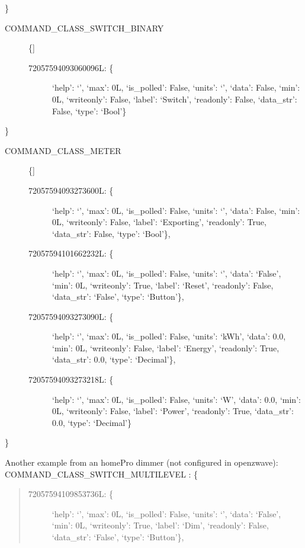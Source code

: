 \documentclass[letterpaper,10pt,english]{sphinxmanual}
\begin{document}
\begin{fulllineitems}
\begin{description}
\begin{description}
\end{description}

\end{description}

\}
\begin{description}
\item[{COMMAND\_CLASS\_SWITCH\_BINARY}] \leavevmode{[}\{{]}\begin{description}
\item[{72057594093060096L: \{}] \leavevmode
`help': `',
`max': 0L,
`is\_polled': False,
`units': `',
`data': False,
`min': 0L,
`writeonly': False,
`label': `Switch',
`readonly': False,
`data\_str': False,
`type': `Bool'\}

\end{description}

\end{description}

\}
\begin{description}
\item[{COMMAND\_CLASS\_METER}] \leavevmode{[}\{{]}\begin{description}
\item[{72057594093273600L: \{}] \leavevmode
`help': `',
`max': 0L,
`is\_polled': False,
`units': `',
`data': False,
`min': 0L,
`writeonly': False,
`label': `Exporting',
`readonly': True,
`data\_str': False,
`type': `Bool'\},

\item[{72057594101662232L: \{}] \leavevmode
`help': `',
`max': 0L,
`is\_polled': False,
`units': `',
`data': `False',
`min': 0L,
`writeonly': True,
`label': `Reset',
`readonly': False,
`data\_str': `False',
`type': `Button'\},

\item[{72057594093273090L: \{}] \leavevmode
`help': `',
`max': 0L,
`is\_polled': False,
`units': `kWh',
`data': 0.0,
`min': 0L,
`writeonly': False,
`label': `Energy',
`readonly': True,
`data\_str': 0.0,
`type': `Decimal'\},

\item[{72057594093273218L: \{}] \leavevmode
`help': `',
`max': 0L,
`is\_polled': False,
`units': `W',
`data': 0.0,
`min': 0L,
`writeonly': False,
`label': `Power',
`readonly': True,
`data\_str': 0.0,
`type': `Decimal'\}

\end{description}

\end{description}

\}

Another example from an homePro dimmer (not configured in openzwave):
COMMAND\_CLASS\_SWITCH\_MULTILEVEL : \{
\begin{quote}
\begin{description}
\item[{72057594109853736L: \{}] \leavevmode
`help': `',
`max': 0L,
`is\_polled': False,
`units': `',
`data': `False',
`min': 0L,
`writeonly': True,
`label': `Dim',
`readonly': False,
`data\_str': `False',
`type': `Button'\},


\end{description}
\end{quote}
\end{fulllineitems}
\end{document}
